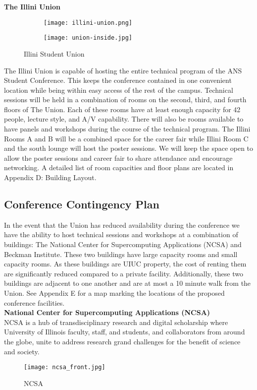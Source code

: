 \textbf{The Illini Union}\\

\begin{figure}[H]
	\centering
	\begin{subfigure}{0.5\textwidth}
		\centering
		\texttt{[image: illini-union.png]}
	\end{subfigure}%
	\begin{subfigure}{0.5\textwidth}
		\centering
		\texttt{[image: union-inside.jpg]}
	\end{subfigure}
	\caption{Illini Student Union}		
\end{figure} 


The Illini Union is capable of hosting the entire technical program of the ANS Student Conference. This keeps the conference contained in one convenient location while being within easy access of the rest of the campus. Technical sessions will be held in a combination of rooms on the second, third, and fourth floors of The Union. Each of these rooms have at least enough capacity for 42 people, lecture style, and A/V capability. There will also be rooms available to have panels and workshops during the course of the technical program. The Illini Rooms A and B will be a combined space for the career fair while Illini Room C and the south lounge will host the poster sessions. We will keep the space open to allow the poster sessions and career fair to share attendance and encourage networking. A detailed list of room capacities and floor plans are located in Appendix D: Building Layout. 

\subsection{Conference Contingency Plan}
In the event that the Union has reduced availability during the conference we have the ability to host technical sessions and workshops at a combination of buildings: The National Center for Supercomputing Applications (NCSA) and Beckman Institute. These two buildings have large capacity rooms and small capacity rooms. As these buildings are UIUC property, the cost of renting them are significantly reduced compared to a private facility. Additionally, these two buildings are adjacent to one another and are at most a 10 minute walk from the Union. See Appendix E for a map marking the locations of the proposed conference facilities.\\


\textbf{National Center for Supercomputing Applications (NCSA)}\\
NCSA is a hub of transdisciplinary research and digital scholarship where University of Illinois faculty, staff, and students, and collaborators from around the globe, unite to address research grand challenges for the benefit of science and society.\\
\begin{figure}[H]
	\centering
	\texttt{[image: ncsa\_front.jpg]}
	\caption{NCSA}
	\label{fig:ncsa}
\end{figure}

